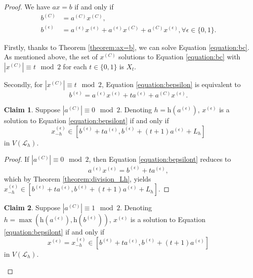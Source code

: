 \documentclass[a4paper, 11pt]{article}
\theoremstyle{plain}
\theoremstyle{definition}
\newtheorem{claim}  {Claim}
\newcommand{\Height}    {\mathrm{h}}
\begin{document}
\begin{proof}
We have $ax = b$ if and only if
\begin{align}
    \label{equation:bc}
    b^{(C)} &= a^{(C)} x^{(C)}, \\
    \label{equation:bepsilon}
    b^{(\epsilon)} &= a^{(\epsilon)} x^{(\epsilon)} + a^{(\epsilon)} x^{(C)} + a^{(C)} x^{(\epsilon)}, \forall \epsilon \in \{0,1\}.
\end{align}

Firstly, thanks to Theorem \ref{theorem:ax=b}, we can solve Equation \eqref{equation:bc}. 
As mentioned above, the set of $x^{(C)}$ solutions to Equation \eqref{equation:bc} with $|x^{(C)}| \equiv t \mod 2$ for each $t \in \{0,1\}$ is $X_t$.

Secondly, for $|x^{(C)}| \equiv t \mod 2$, Equation \eqref{equation:bepsilon} is equivalent to
\begin{equation}
    \label{equation:bepsilont}
    b^{(\epsilon)} = a^{(\epsilon)} x^{(\epsilon)} + t a^{(\epsilon)} + a^{(C)} x^{(\epsilon)}.
\end{equation}

\begin{claim}
Suppose $|a^{(C)}| \equiv 0 \mod 2$. Denoting $h = \Height( a^{(\epsilon)} )$, $x^{(\epsilon)}$ is a solution to Equation \eqref{equation:bepsilont} if and only if
\[
    x^{(\epsilon)}_{ -h } \in [ b^{(\epsilon)} + t a^{(\epsilon)}, b^{(\epsilon)} + (t + 1) a^{(\epsilon)} + L_h ]
\]
in $V( \mathcal{L}_h )$.
\end{claim}

\begin{proof}
If $|a^{(C)}| \equiv 0 \mod 2$, then Equation \eqref{equation:bepsilont} reduces to
\[
    a^{(\epsilon)} x^{(\epsilon)} = b^{(\epsilon)} + t a^{(\epsilon)},
\]
which by Theorem \ref{theorem:division_Lh}, yields $x^{(\epsilon)}_{ -h } \in [ b^{(\epsilon)} + t a^{(\epsilon)}, b^{(\epsilon)} + (t + 1) a^{(\epsilon)} + L_h ]$.
\end{proof}


\begin{claim}
Suppose $|a^{(C)}| \equiv 1 \mod 2$. Denoting $h = \max ( \Height( a^{(\epsilon)} ), \Height( b^{(\epsilon)} ) )$, $x^{(\epsilon)}$ is a solution to Equation \eqref{equation:bepsilont} if and only if
\[
    x^{(\epsilon)} = x^{(\epsilon)}_{ -h } \in [ b^{(\epsilon)} + t a^{(\epsilon)}, b^{(\epsilon)} + (t + 1) a^{(\epsilon)} ]
\]
in $V( \mathcal{L}_h )$.
\end{claim}



\end{proof}
\end{document}
